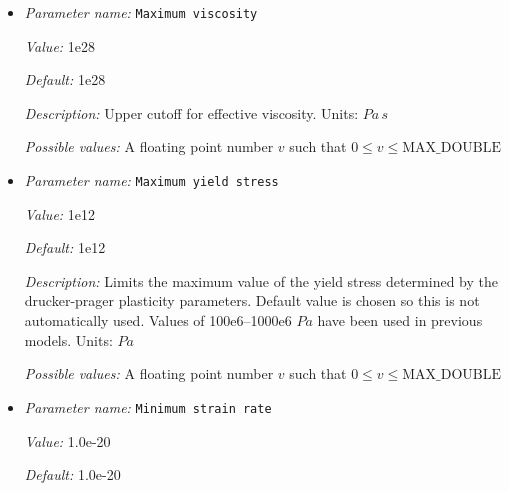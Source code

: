 \begin{itemize}
{\it Value:} 1.25e3


{\it Default:} 1.25e3


{\it Description:} List of heat capacities $C_p$, for background material and compositional fields, for a total of N+1 values, where N is the number of compositional fields. If only one value is given, then all use the same value.  Units: $J/kg/K$


{\it Possible values:} A list of 0 to 4294967295 elements where each element is [A floating point number $v$ such that $0 \leq v \leq \text{MAX\_DOUBLE}$]
\item {\it Parameter name:} {\tt Maximum viscosity}
\label{parameters:Material model/Visco Plastic/Maximum viscosity}


{\it Value:} 1e28


{\it Default:} 1e28


{\it Description:} Upper cutoff for effective viscosity. Units: $Pa \, s$


{\it Possible values:} A floating point number $v$ such that $0 \leq v \leq \text{MAX\_DOUBLE}$
\item {\it Parameter name:} {\tt Maximum yield stress}
\label{parameters:Material model/Visco Plastic/Maximum yield stress}


{\it Value:} 1e12


{\it Default:} 1e12


{\it Description:} Limits the maximum value of the yield stress determined by the drucker-prager plasticity parameters. Default value is chosen so this is not automatically used. Values of 100e6--1000e6 $Pa$ have been used in previous models. Units: $Pa$


{\it Possible values:} A floating point number $v$ such that $0 \leq v \leq \text{MAX\_DOUBLE}$
\item {\it Parameter name:} {\tt Minimum strain rate}
\label{parameters:Material model/Visco Plastic/Minimum strain rate}


{\it Value:} 1.0e-20


{\it Default:} 1.0e-20



\end{itemize}
